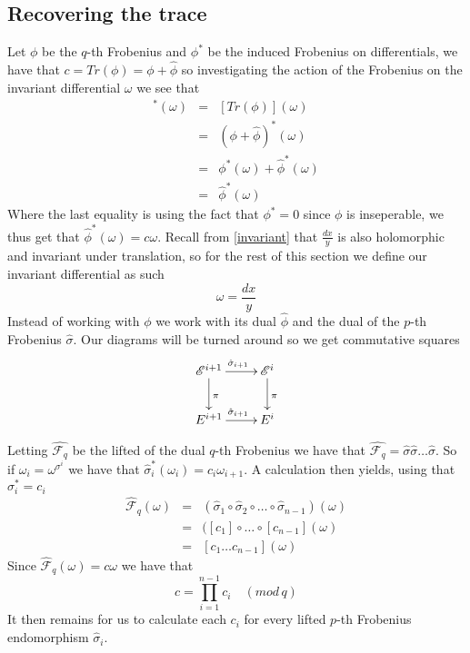 \subsection{Recovering the trace}
Let $\phi$ be the $q$-th Frobenius and $\phi^*$ be the induced Frobenius on differentials, 
we have that $c = Tr(\phi) = \phi + \hat{\phi}$ so investigating the
action of the Frobenius on the invariant differential $\omega$ we see that
\begin{eqnarray}
 [Tr(\phi)]^*(\omega)&=& [Tr(\phi)](\omega) \nonumber \\
		     &=& (\phi + \hat{\phi})^*(\omega) \nonumber \\
		     &=& \phi^*(\omega) + \hat{\phi}^*(\omega) \nonumber \\
		     &=& \hat{\phi}^*(\omega) \nonumber
\end{eqnarray}
Where the last equality is using the fact that $\phi^* = 0$ since $\phi$ is inseperable, we thus
get that $\hat{\phi}^*(\omega) = c\omega$.
Recall from \ref{invariant} that $\frac{dx}{y}$ is also holomorphic and invariant under translation,
so for the rest of this section we define our invariant differential as such
$$ \omega = \frac{dx}{y} $$
Instead of working with $\phi$ we work with its dual $\hat{\phi}$ and the dual
of the $p$-th Frobenius $\hat{\sigma}$. Our diagrams will be turned around so we get commutative
squares
$$
\xymatrix {
  \mathscr{E}^{i+1} \ar[r]^{\hat{\sigma}_{i+1}} \ar[d]^\pi & \mathscr{E}^i \ar[d]^\pi \\
  E^{i+1} \ar[r]^{\hat{\sigma}_{i+1}} & E^i 
}
$$

Letting $\hat{\mathscr{F}_q}$ be the lifted of the dual $q$-th Frobenius we have that
$\hat{\mathscr{F}_q} = \hat{\sigma} \hat{\sigma} \ldots \hat{\sigma}$.
So if $\omega_i = \omega^{\sigma^i}$ we have that $\hat{\sigma}_i^*(\omega_i) = c_i \omega_{i+1}$.
A calculation then yields, using that $\sigma_i^* = c_i$
\begin{eqnarray}
  \hat{\mathscr{F}}_q(\omega) &=& (\hat{\sigma}_1 \circ \hat{\sigma}_2 \circ \ldots \circ \hat{\sigma}_{n-1})(\omega) \nonumber \\
			      &=& ([c_1] \circ \ldots \circ [c_{n-1}](\omega) \nonumber \\
			      &=& [c_1\ldots c_{n-1}](\omega) \nonumber
\end{eqnarray}
Since $\hat{\mathscr{F}}_q(\omega) = c \omega$ we have that
$$ c = \prod_{i=1}^{n-1} c_i \quad (mod\, q) $$
It then remains for us to calculate each $c_i$ for every lifted $p$-th Frobenius
endomorphism $\hat{\sigma}_i$.

